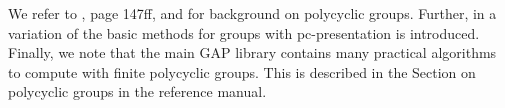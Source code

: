 We refer to \cite{Rob82}, page 147ff, and \cite{Seg83} for background on 
polycyclic groups. Further, in \cite{Sims94} a variation of the basic 
methods for groups with pc-presentation is introduced. Finally, we note 
that the main GAP library contains many practical algorithms to compute 
with finite polycyclic groups. This is described in the Section on 
polycyclic groups in the reference manual. 

